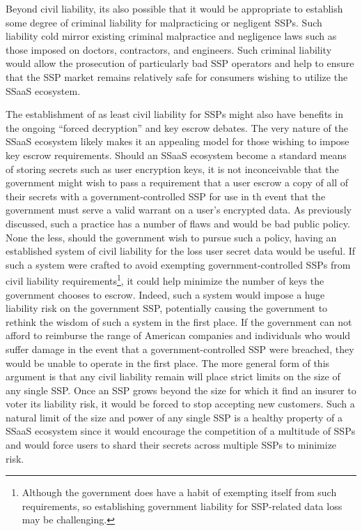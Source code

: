 Beyond civil liability, its also possible that it would be appropriate
to establish some degree of criminal liability for malpracticing or
negligent SSPs. Such liability cold mirror existing criminal
malpractice and negligence laws such as those imposed on doctors,
contractors, and engineers. Such criminal liability would allow the
prosecution of particularly bad SSP operators and help to ensure that
the SSP market remains relatively safe for consumers wishing to
utilize the SSaaS ecosystem.

The establishment of as least civil liability for SSPs might also have
benefits in the ongoing ``forced decryption'' and key escrow
debates. The very nature of the SSaaS ecosystem likely makes it an
appealing model for those wishing to impose key escrow
requirements. Should an SSaaS ecosystem become a standard means of
storing secrets such as user encryption keys, it is not inconceivable
that the government might wish to pass a requirement that a user
escrow a copy of all of their secrets with a government-controlled SSP
for use in th event that the government must serve a valid warrant on
a user's encrypted data. As previously discussed, such a practice has
a number of flaws and would be bad public policy. None the less,
should the government wish to pursue such a policy, having an
established system of civil liability for the loss user secret data
would be useful. If such a system were crafted to avoid exempting
government-controlled SSPs from civil liability
requirements\footnote{Although the government does have a habit of
  exempting itself from such requirements, so establishing government
  liability for SSP-related data loss may be challenging.}, it could
help minimize the number of keys the government chooses to
escrow. Indeed, such a system would impose a huge liability risk on
the government SSP, potentially causing the government to rethink the
wisdom of such a system in the first place. If the government can not
afford to reimburse the range of American companies and individuals
who would suffer damage in the event that a government-controlled SSP
were breached, they would be unable to operate in the first place. The
more general form of this argument is that any civil liability remain
will place strict limits on the size of any single SSP. Once an SSP
grows beyond the size for which it find an insurer to voter its
liability risk, it would be forced to stop accepting new
customers. Such a natural limit of the size and power of any single
SSP is a healthy property of a SSaaS ecosystem since it would
encourage the competition of a multitude of SSPs and would force users
to shard their secrets across multiple SSPs to minimize risk.

